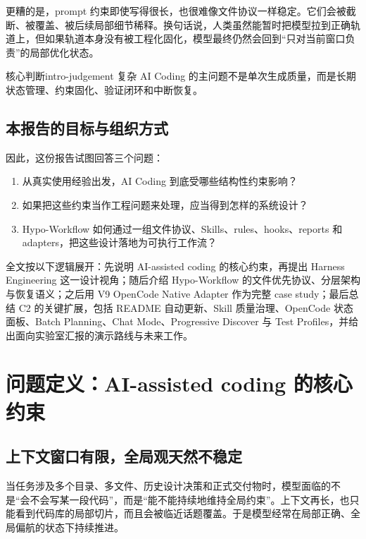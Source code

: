 \documentclass[
  outputdir=build,
  chapterstyle=cn,
  colorscheme=Simple,
  fontset=tech,
  code=false
]{Hypo-Note}
\begin{document}
更糟的是，prompt 约束即使写得很长，也很难像文件协议一样稳定。它们会被截断、被覆盖、被后续局部细节稀释。换句话说，人类虽然能暂时把模型拉到正确轨道上，但如果轨道本身没有被工程化固化，模型最终仍然会回到“只对当前窗口负责”的局部优化状态。

\begin{important}{核心判断}{intro-judgement}
复杂 AI Coding 的主问题不是单次生成质量，而是长期状态管理、约束固化、验证闭环和中断恢复。
\end{important}

\section{本报告的目标与组织方式}

因此，这份报告试图回答三个问题：

\begin{enumerate}[leftmargin=2em]
  \item 从真实使用经验出发，AI Coding 到底受哪些结构性约束影响？
  \item 如果把这些约束当作工程问题来处理，应当得到怎样的系统设计？
  \item Hypo-Workflow 如何通过一组文件协议、Skills、rules、hooks、reports 和 adapters，把这些设计落地为可执行工作流？
\end{enumerate}

全文按以下逻辑展开：先说明 AI-assisted coding 的核心约束，再提出 Harness Engineering 这一设计视角；随后介绍 Hypo-Workflow 的文件优先协议、分层架构与恢复语义；之后用 V9 OpenCode Native Adapter 作为完整 case study；最后总结 C2 的关键扩展，包括 README 自动更新、Skill 质量治理、OpenCode 状态面板、Batch Planning、Chat Mode、Progressive Discover 与 Test Profiles，并给出面向实验室汇报的演示路线与未来工作。

\chapter{问题定义：AI-assisted coding 的核心约束}

\section{上下文窗口有限，全局观天然不稳定}

当任务涉及多个目录、多文件、历史设计决策和正式交付物时，模型面临的不是“会不会写某一段代码”，而是“能不能持续地维持全局约束”。上下文再长，也只能看到代码库的局部切片，而且会被临近话题覆盖。于是模型经常在局部正确、全局偏航的状态下持续推进。
\end{document}
